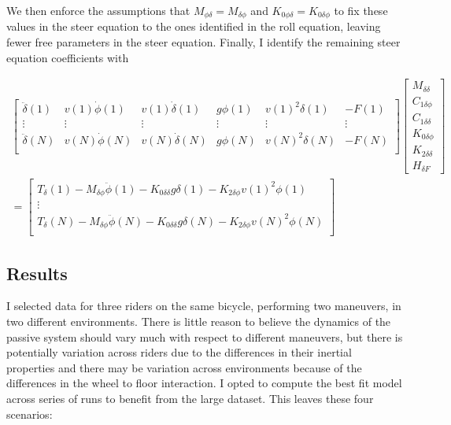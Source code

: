 \documentclass[a4paper]{article}
\begin{document}
We then enforce the assumptions that $M_{\phi\delta} = M_{\delta\phi}$ and
$K_{0\phi\delta} = K_{0\delta\phi}$ to fix these values in the steer equation
to the ones identified in the roll equation, leaving fewer free parameters in
the steer equation. Finally, I identify the remaining steer equation
coefficients with

\begin{align}
  \begin{bmatrix}
    \ddot{\delta}(1) &
    v(1) \dot{\phi}(1) &
    v(1) \dot{\delta}(1) &
    g \phi(1) &
    v(1)^2 \delta(1) &
    - F(1)\\
    \vdots & \vdots & \vdots & \vdots & \vdots & \vdots \\
    \ddot{\delta}(N) &
    v(N) \dot{\phi}(N) &
    v(N) \dot{\delta}(N) &
    g \phi(N) &
    v(N)^2 \delta(N) &
    - F(N)\\
  \end{bmatrix}
  \begin{bmatrix}
    M_{\delta\delta} \\
    C_{1\delta\phi} \\
    C_{1\delta\delta} \\
    K_{0\delta\phi} \\
    K_{2\delta\delta} \\
    H_{\delta F}
  \end{bmatrix} \nonumber \\
  =
  \begin{bmatrix}
    T_\delta(1)
    - M_{\delta\phi} \ddot{\phi}(1)
    - K_{0\delta\delta} g \delta(1)
    - K_{2\delta\phi} v(1)^2 \phi(1) \\
    \vdots\\
    T_\delta(N)
    - M_{\delta\phi} \ddot{\phi}(N)
    - K_{0\delta\delta} g \delta(N)
    - K_{2\delta\phi} v(N)^2 \phi(N) \\
  \end{bmatrix}
\end{align}

\subsection{Results}

I selected data for three riders on the same bicycle, performing two
maneuvers, in two different environments. There is little reason to
believe the dynamics of the passive system should vary much with respect
to different maneuvers, but there is potentially variation across riders
due to the differences in their inertial properties and there may be
variation across environments because of the differences in the wheel to
floor interaction. I opted to compute the best fit model across series
of runs to benefit from the large dataset. This leaves these four
scenarios:
\end{document}
